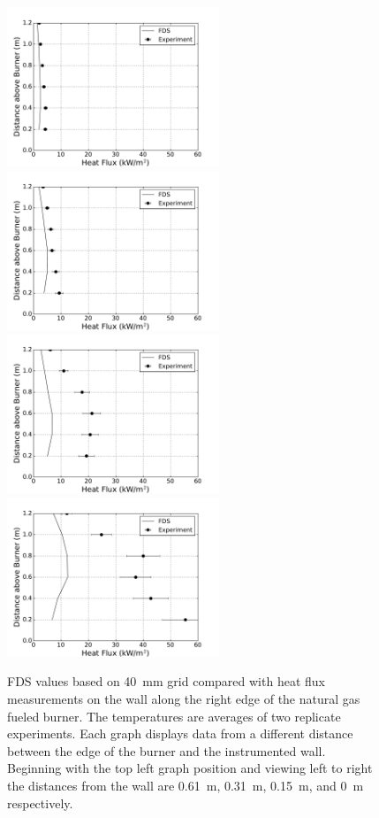 \documentclass[twoside]{uocthesis}
\begin{document}
\begin{figure}[ht!]
  \centering
  \includegraphics[width=2.5in]{../Figures/IWGB_NG_HF_Offset_Avg_2D}
  \includegraphics[width=2.5in]{../Figures/IWGB_NG_HF_Offset_Avg_1D}\\
  \includegraphics[width=2.5in]{../Figures/IWGB_NG_HF_Offset_Avg_0p5D}
  \includegraphics[width=2.5in]{../Figures/IWGB_NG_HF_Offset_Avg_0D}\\
  \caption[FDS values based on 40~mm grid compared with heat flux measurements on the wall along the right edge of the natural gas fueled burner]{FDS values based on 40~mm grid compared with heat flux measurements on the wall along the right edge of the natural gas fueled burner. The temperatures are averages of two replicate experiments. Each graph displays data from a different distance between the edge of the burner and the instrumented wall.  Beginning with the top left graph position and viewing left to right the distances from the wall are 0.61~m, 0.31~m, 0.15~m, and 0~m respectively.}
  \label{FDS_HFEdge_TWNG_comp}
\end{figure}
\end{document}
